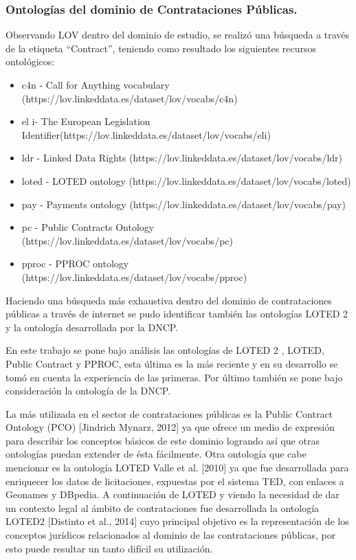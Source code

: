 \subsubsection{Ontologías del dominio de Contrataciones Públicas.}

Observando LOV dentro del dominio de estudio, se realizó una búsqueda a través de la etiqueta “Contract”, teniendo como resultado los siguientes recursos ontológicos:

\begin{itemize}
    \item c4n - Call for Anything vocabulary (https://lov.linkeddata.es/dataset/lov/vocabs/c4n)
    \item     el i- The European Legislation Identifier(https://lov.linkeddata.es/dataset/lov/vocabs/eli)
    \item ldr - Linked Data Rights (https://lov.linkeddata.es/dataset/lov/vocabs/ldr)
    \item loted - LOTED ontology (https://lov.linkeddata.es/dataset/lov/vocabs/loted)
    \item pay - Payments ontology (https://lov.linkeddata.es/dataset/lov/vocabs/pay)
    \item  pc - Public Contracts Ontology (https://lov.linkeddata.es/dataset/lov/vocabs/pc)
    \item pproc - PPROC ontology (https://lov.linkeddata.es/dataset/lov/vocabs/pproc)  
\end{itemize}


Haciendo una búsqueda más exhaustiva dentro del dominio de contrataciones públicas a través de internet se pudo identificar también las ontologías LOTED 2 y la ontología desarrollada por la DNCP.

En este trabajo se pone bajo análisis las ontologías de LOTED 2 , LOTED, Public Contract y PPROC, esta última es la más reciente y en su desarrollo se tomó en cuenta la experiencia de las primeras. Por último también se pone bajo consideración la ontología de la DNCP.

La más utilizada en el sector de contrataciones públicas es la Public Contract Ontology (PCO) [Jindrich Mynarz, 2012] ya que ofrece un medio de expresión para describir los conceptos básicos de este dominio logrando así que otras ontologías puedan extender de ésta fácilmente. Otra ontología que cabe mencionar es la ontología LOTED Valle et al. [2010] ya que fue desarrollada para enriquecer los datos de licitaciones, expuestas por el sistema TED, con enlaces a Geonames y DBpedia. A continuación de LOTED y viendo la necesidad de dar un contexto legal al ámbito de contrataciones fue desarrollada la ontología LOTED2 [Distinto et al., 2014] cuyo principal objetivo es la representación de los conceptos jurídicos relacionados al dominio de las contrataciones públicas, por esto puede resultar un tanto difícil su utilización.

